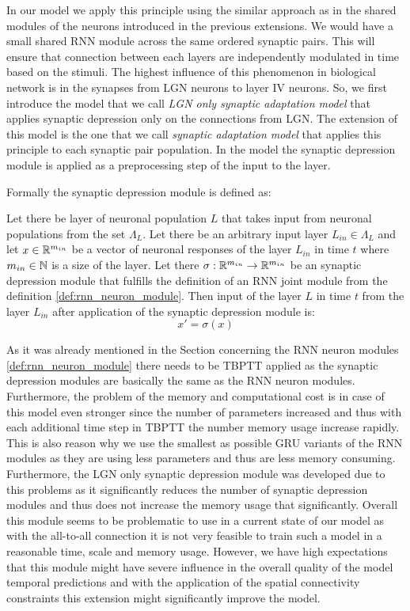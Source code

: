In our model we apply this principle using the similar approach as in the shared modules of the neurons introduced in the previous extensions. We would have a small shared RNN module across the same ordered synaptic pairs. This will ensure that connection between each layers are independently modulated in time based on the stimuli. The highest influence of this phenomenon in biological network is in the synapses from LGN neurons to layer IV neurons. So, we first introduce the model that we call \emph{LGN only synaptic adaptation model} that applies synaptic depression only on the connections from LGN. The extension of this model is the one that we call \emph{synaptic adaptation model} that applies this principle to each synaptic pair population. In the model the synaptic depression module is applied as a preprocessing step of the input to the layer.

Formally the synaptic depression module is defined as:

\begin{defn}
    Let there be layer of neuronal population $L$ that takes input from neuronal populations from the set $\Lambda_{L}$. Let there be an arbitrary input layer $L_{in} \in \Lambda_{L}$ and let $x \in \mathbb{R}^{m_{in}}$ be a vector of neuronal responses of the layer $L_{in}$ in time $t$ where $m_{in} \in \mathbb{N}$ is a size of the layer. Let there $\sigma: \mathbb{R}^{m_{in}} \to \mathbb{R}^{m_{in}}$ be an synaptic depression module that fulfills the definition of an RNN joint module from the definition \ref{def:rnn_neuron_module}. Then input of the layer $L$ in time $t$ from the layer $L_{in}$ after application of the synaptic depression module is:
    $$x' = \sigma(x)$$
\end{defn}
\label{def:synaptic_depression}

As it was already mentioned in the Section concerning the RNN neuron modules \ref{def:rnn_neuron_module} there needs to be TBPTT applied as the synaptic depression modules are basically the same as the RNN neuron modules. Furthermore, the problem of the memory and computational cost is in case of this model even stronger since the number of parameters increased and thus with each additional time step in TBPTT the number memory usage increase rapidly. This is also reason why we use the smallest as possible GRU variants of the RNN modules as they are using less parameters and thus are less memory consuming. Furthermore, the LGN only synaptic depression module was developed due to this problems as it significantly reduces the number of synaptic depression modules and thus does not increase the memory usage that significantly. Overall this module seems to be problematic to use in a current state of our model as with the all-to-all connection it is not very feasible to train such a model in a reasonable time, scale and memory usage. However, we have high expectations that this module might have severe influence in the overall quality of the model temporal predictions and with the application of the spatial connectivity constraints this extension might significantly improve the model.